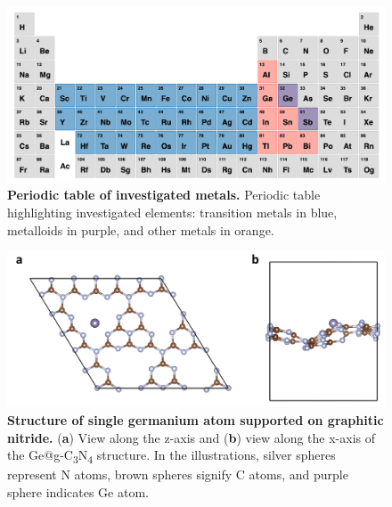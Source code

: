 \documentclass[a4paper, 12pt]{article}
\begin{document}
\begin{figure}[htbp]
  \centering
  \includegraphics[width=\textwidth]{supp_fig1_ptable.png}
  \caption{\textbf{Periodic table of investigated metals.}
  Periodic table highlighting investigated elements: transition metals in blue, metalloids in purple, and other metals in orange.}
  \label{supp_fig1:ptable}
\end{figure}

\begin{figure}[htbp]
  \centering
  \includegraphics[width=\textwidth]{supp_fig2_Ge_g-C3N4.png}
  \caption{\textbf{Structure of single germanium atom supported on graphitic nitride.}
  (\textbf{a}) View along the z-axis and (\textbf{b}) view along the x-axis
  of the Ge@g-C\textsubscript{3}N\textsubscript{4} structure.
  In the illustrations, silver spheres represent N atoms, brown spheres
  signify C atoms, and purple sphere indicates Ge atom.}
  \label{supp_fig2:Ge_g-C3N4}
\end{figure}
\end{document}

